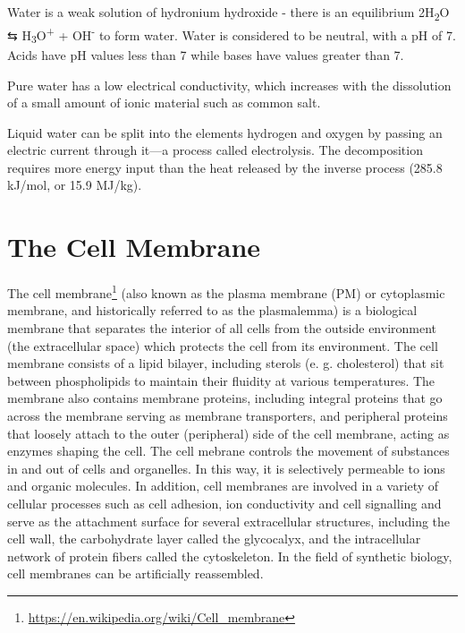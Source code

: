 \documentclass[
]{book}
\renewcommand{\href}[2]{#2\footnote{\url{#1}}}
\begin{document}
Water is a weak solution of hydronium hydroxide - there is an equilibrium 2H\textsubscript{2}O ⇆
H\textsubscript{3}O\textsuperscript{+} + OH\textsuperscript{-} to form water. Water is considered to be neutral, with a pH of 7. Acids have pH values less than 7 while bases have values greater than 7.

Pure water has a low electrical conductivity, which increases with the dissolution of a small amount of ionic material such as common salt.

Liquid water can be split into the elements hydrogen and oxygen by passing an electric current through it---a process called electrolysis. The decomposition requires more energy input than the heat released by the inverse process (285.8 kJ/mol, or 15.9 MJ/kg).

\hypertarget{the-cell-membrane}{%
\chapter{The Cell Membrane}\label{the-cell-membrane}}

The \href{https://en.wikipedia.org/wiki/Cell_membrane}{cell membrane} (also known as the plasma membrane (PM) or cytoplasmic membrane, and historically referred to as the plasmalemma) is a biological membrane that separates the interior of all cells from the outside environment (the extracellular space) which protects the cell from its environment. The cell membrane consists of a lipid bilayer, including sterols (e. g. cholesterol) that sit between phospholipids to maintain their fluidity at various temperatures. The membrane also contains membrane proteins, including integral proteins that go across the membrane serving as membrane transporters, and peripheral proteins that loosely attach to the outer (peripheral) side of the cell membrane, acting as enzymes shaping the cell. The cell mebrane controls the movement of substances in and out of cells and organelles. In this way, it is selectively permeable to ions and organic molecules. In addition, cell membranes are involved in a variety of cellular processes such as cell adhesion, ion conductivity and cell signalling and serve as the attachment surface for several extracellular structures, including the cell wall, the carbohydrate layer called the glycocalyx, and the intracellular network of protein fibers called the cytoskeleton. In the field of synthetic biology, cell membranes can be artificially reassembled.
\end{document}
